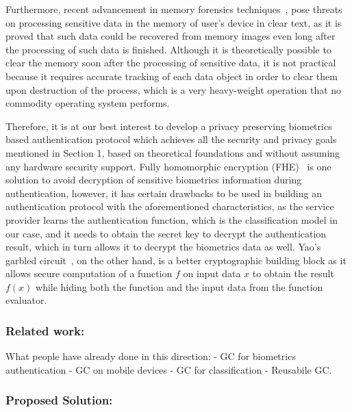 \documentclass[10pt]{article}
\begin{document}
Furthermore, recent advancement in memory forensics techniques~\cite{dimsum}, pose threats on processing sensitive data in the memory of user's 
device in clear text, as it is proved that such data could be recovered from memory images even long after the processing of such data is finished. 
Although it is theoretically possible to clear the memory soon after the processing of sensitive data, it is not practical because it requires 
accurate tracking of each data object in order to clear them upon destruction of the process, which is a very heavy-weight operation 
that no commodity operating system performs.

Therefore, it is at our best interest to develop a privacy preserving biometrics based authentication protocol which achieves all the security and 
privacy goals mentioned in Section 1, based on theoretical foundations and without assuming any hardware security support. Fully homomorphic 
encryption (FHE)~\cite{fhe} is one solution to avoid decryption of sensitive biometrics information during authentication, however, it has certain 
drawbacks to be used in building an authentication protocol with the aforementioned characteristics, as the service provider learns the 
authentication function, which is the classification model in our case, and it needs to obtain the secret key to decrypt the authentication result, 
which in turn allows it to decrypt the biometrics data as well. Yao's garbled circuit~\cite{yaogc}, on the other hand, is a better cryptographic 
building block as it allows secure computation of a function $f$ on input data $x$ to obtain the result $f(x)$ while hiding both the function and the 
input data from the function evaluator.

\subsubsection*{Related work:}
What people have already done in this direction:
- GC for biometrics authentication
- GC on mobile devices
- GC for classification
- Reusabile GC.

\subsubsection*{Proposed Solution:}
\end{document}
